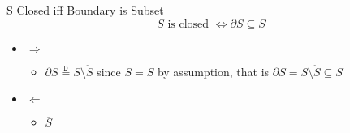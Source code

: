 \documentclass{standalone}
\begin{document}
\begin{theo*}{S Closed iff Boundary is Subset}
  \[
  S \text{ is closed } \Leftrightarrow \partial S \subseteq S
  \]
  \begin{pf}
    \begin{itemize}
      \item $ \Rightarrow $ 
      \begin{itemize}
        \item $ \partial S \stackrel{\mathtt{D}}{=} \overline{S}  \setminus \mathring{S} $ since $ S = \overline{S} $ by assumption, that is $ \partial S = S \setminus \mathring{S} \subseteq S$ 
      \end{itemize}
      \item $ \Leftarrow $ 
        \begin{itemize}
          \item $ \overline{S} $  
        \end{itemize}
    \end{itemize}
  \end{pf}
\end{theo*}
\end{document}
